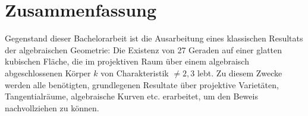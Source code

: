 \documentclass[12pt,a4paper,twoside]{article}
\begin{document}
\pagestyle{empty}


\section*{Zusammenfassung}

Gegenstand dieser Bachelorarbeit ist die Ausarbeitung eines klassischen Resultats der algebraischen Geometrie: Die Existenz von 27 Geraden auf einer glatten kubischen Fläche, die im projektiven Raum über einem algebraisch abgeschlossenen Körper $k$ von Charakteristik $\neq 2,3$ lebt.
Zu diesem Zwecke werden alle benötigten, grundlegenen Resultate über projektive Varietäten, Tangentialräume, algebraische Kurven etc. erarbeitet, um den Beweis nachvollziehen zu können.

\newpage
\tableofcontents

\newpage

\pagestyle{headings}


% 
















\end{document}
